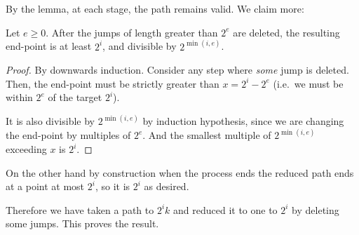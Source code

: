 \documentclass[11pt]{scrartcl}
\begin{document}
By the lemma, at each stage, the path remains valid.
We claim more:
\begin{claim*}
  Let $e \ge 0$.
  After the jumps of length greater than $2^e$ are deleted,
  the resulting end-point is at least $2^i$,
  and divisible by $2^{\min(i,e)}$.
\end{claim*}
\begin{proof}
  By downwards induction.
  Consider any step where \emph{some} jump is deleted.
  Then, the end-point must be strictly greater than $x = 2^i - 2^e$
  (i.e.\ we must be within $2^e$ of the target $2^i$).

  It is also divisible by $2^{\min(i,e)}$ by induction hypothesis,
  since we are changing the end-point by multiples of $2^e$.
  And the smallest multiple of $2^{\min(i,e)}$ exceeding $x$ is $2^i$.
\end{proof}
On the other hand by construction when the process ends
the reduced path ends at a point at most $2^i$,
so it is $2^i$ as desired.

Therefore we have taken a path to $2^i k$
and reduced it to one to $2^i$ by deleting some jumps.
This proves the result.
\pagebreak
\end{document}
